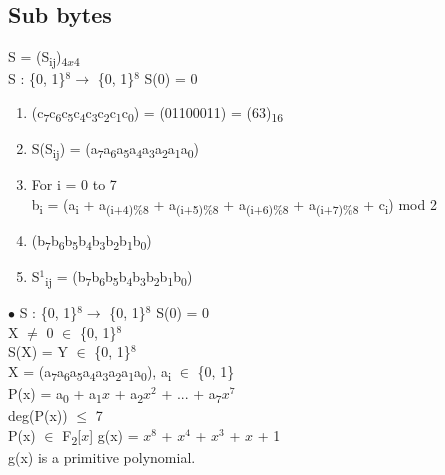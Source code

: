 \documentclass[11pt]{article}
\begin{document}
	\subsection{Sub bytes}
	S = (S\textsubscript{ij})\textsubscript{$4x4$}\\
	S : \{0, 1\}$^{8} \rightarrow$ \{0, 1\}$^{8}$ \hspace{1cm} S(0) = 0\\
	\begin{enumerate}[label=\roman*.]
		\item (c\textsubscript{7}c\textsubscript{6}c\textsubscript{5}c\textsubscript{4}c\textsubscript{3}c\textsubscript{2}c\textsubscript{1}c\textsubscript{0}) = (01100011) = (63)\textsubscript{16}
		\item S(S\textsubscript{ij}) = (a\textsubscript{7}a\textsubscript{6}a\textsubscript{5}a\textsubscript{4}a\textsubscript{3}a\textsubscript{2}a\textsubscript{1}a\textsubscript{0})
		\item For i = 0 to 7 \\ \hspace{0.6cm} b\textsubscript{i} = (a\textsubscript{i} + a\textsubscript{(i+4)\%8} + a\textsubscript{(i+5)\%8} + a\textsubscript{(i+6)\%8} + a\textsubscript{(i+7)\%8} + c\textsubscript{i}) mod 2
		\item (b\textsubscript{7}b\textsubscript{6}b\textsubscript{5}b\textsubscript{4}b\textsubscript{3}b\textsubscript{2}b\textsubscript{1}b\textsubscript{0})
		\item S$^1$\textsubscript{ij} = (b\textsubscript{7}b\textsubscript{6}b\textsubscript{5}b\textsubscript{4}b\textsubscript{3}b\textsubscript{2}b\textsubscript{1}b\textsubscript{0})
	\end{enumerate}
	$\bullet$ S : \{0, 1\}$^{8} \rightarrow$ \{0, 1\}$^{8}$ \hspace{1cm} S(0) = 0\\
	X $\neq$ 0 $\in$ \{0, 1\}$^{8}$\\
	S(X) = Y $\in$ \{0, 1\}$^{8}$\\
	X = (a\textsubscript{7}a\textsubscript{6}a\textsubscript{5}a\textsubscript{4}a\textsubscript{3}a\textsubscript{2}a\textsubscript{1}a\textsubscript{0}), a\textsubscript{i} $\in$ \{0, 1\}\\
	P(x) = a\textsubscript{0} + a\textsubscript{1}$x$ + a\textsubscript{2}$x^2$ + ... + a\textsubscript{7}$x^7$\\
	deg(P(x)) $\leq$ 7\\
	P(x) $\in$ F\textsubscript{2}[$x$]\hfill
	g(x) = $x^8$ + $x^4$ + $x^3$ + $x$ + 1\\\hfill g(x) is a primitive polynomial.\\
\end{document}
